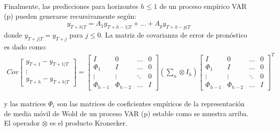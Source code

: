 	
	Finalmente, las predicciones para horizontes $h \le 1$ de un proceso emp\'{i}rico VAR (p) pueden generarse recursivamente seg\'un:
	\begin{equation*}
	y_{T + h | T} = A_1y_{T + h-1 | T} + \dots{} + A_py_{T + h-p | T} 
	\end{equation*}
	donde $y_{T + j | T} = y_{T + j}$ para $j \le 0$. 
	La matriz de covarianza de error de pron\'ostico es dado como:\\
	\footnotesize
	\begin{gather*}
	Cov\begin{bmatrix} y_{T + 1} - y_{T + 1 | T} \\ \vdots{} \\ y_{T + h} - y_{T + h | T} \end{bmatrix}
	=
	\begin{bmatrix} I & 0 & \dots{} & 0 \\
	\Phi_1 & I & \dots{}  & 0 \\
	\vdots{} & \vdots{} & \ddots{} &  0 \\
	\Phi_{h-1} & \Phi_{h-2} & \dots{} & I 
	\end{bmatrix}
	(\sum_u \otimes I_h)
	\begin{bmatrix} I & 0 & \dots{} & 0 \\
	\Phi_1 & I & \dots{}  & 0 \\
	\vdots{} & \vdots{} & \ddots{} &  0 \\
	\Phi_{h-1} & \Phi_{h-2} & \dots{} & I 
	\end{bmatrix}^T
	\end{gather*}
	
	y las matrices $\Phi_i$ son las matrices de coeficientes emp\'{i}ricos de la representaci\'on de media m\'ovil de Wold de un proceso VAR (p) estable como se muestra arriba. El operador $\otimes$ es el producto Kronecker.
	
